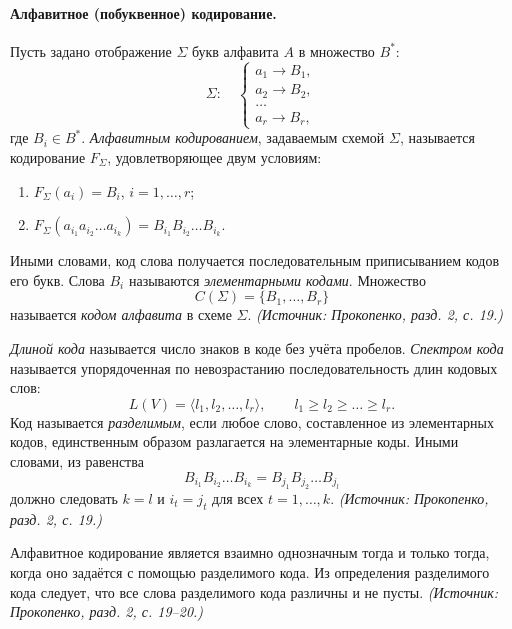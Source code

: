 \documentclass[a4paper,12pt]{article}
\begin{document}
\paragraph{Алфавитное (побуквенное) кодирование.}
Пусть задано отображение \(\Sigma\) букв алфавита \(A\) в множество \(B^*\):
\[
\Sigma:\quad
\begin{cases}
a_1\to B_1,\\
a_2\to B_2,\\
\dots\\
a_r\to B_r,
\end{cases}
\]
где \(B_i\in B^*\). \emph{Алфавитным кодированием}, задаваемым схемой \(\Sigma\), называется кодирование \(F_\Sigma\), удовлетворяющее двум условиям:
\begin{enumerate}[label=\arabic*)]
\item \(F_\Sigma(a_i)=B_i\), \(i=1,\dots,r\);
\item \(F_\Sigma(a_{i_1}a_{i_2}\dots a_{i_k})=B_{i_1}B_{i_2}\dots B_{i_k}\).
\end{enumerate}
Иными словами, код слова получается последовательным приписыванием кодов его букв. Слова \(B_i\) называются \emph{элементарными кодами}. Множество
\[
C(\Sigma)=\{B_1,\dots,B_r\}
\]
называется \emph{кодом алфавита} в схеме \(\Sigma\).
\textit{(Источник: Прокопенко, разд. 2, с. 19.)}

\emph{Длиной кода} называется число знаков в коде без учёта пробелов. \emph{Спектром кода} называется упорядоченная по невозрастанию последовательность длин кодовых слов:
\[
L(V)=\langle l_1,l_2,\dots,l_r\rangle,\qquad l_1\ge l_2\ge\dots\ge l_r.
\]
Код называется \emph{разделимым}, если любое слово, составленное из элементарных кодов, единственным образом разлагается на элементарные коды. Иными словами, из равенства
\[
B_{i_1}B_{i_2}\dots B_{i_k}=B_{j_1}B_{j_2}\dots B_{j_l}
\]
должно следовать \(k=l\) и \(i_t=j_t\) для всех \(t=1,\dots,k\).
\textit{(Источник: Прокопенко, разд. 2, с. 19.)}

Алфавитное кодирование является взаимно однозначным тогда и только тогда, когда оно задаётся с помощью разделимого кода. Из определения разделимого кода следует, что все слова разделимого кода различны и не пусты.
\textit{(Источник: Прокопенко, разд. 2, с. 19--20.)}
\end{document}
